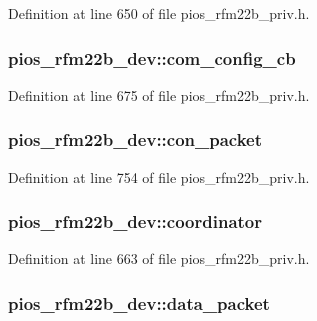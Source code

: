 Definition at line 650 of file pios\-\_\-rfm22b\-\_\-priv.\-h.

\hypertarget{structpios__rfm22b__dev_abed55ffe3e0e2832d958e692f9310b6e}{
\subsubsection[{com\-\_\-config\-\_\-cb}]{ pios\-\_\-rfm22b\-\_\-dev\-::com\-\_\-config\-\_\-cb}}\label{structpios__rfm22b__dev_abed55ffe3e0e2832d958e692f9310b6e}


Definition at line 675 of file pios\-\_\-rfm22b\-\_\-priv.\-h.

\hypertarget{structpios__rfm22b__dev_a8bfeaddca61583fad2b2396d61d4c459}{
\subsubsection[{con\-\_\-packet}]{ pios\-\_\-rfm22b\-\_\-dev\-::con\-\_\-packet}}\label{structpios__rfm22b__dev_a8bfeaddca61583fad2b2396d61d4c459}


Definition at line 754 of file pios\-\_\-rfm22b\-\_\-priv.\-h.

\hypertarget{structpios__rfm22b__dev_a37c2eab9f05656b3ef5690689b0e06c9}{
\subsubsection[{coordinator}]{ pios\-\_\-rfm22b\-\_\-dev\-::coordinator}}\label{structpios__rfm22b__dev_a37c2eab9f05656b3ef5690689b0e06c9}


Definition at line 663 of file pios\-\_\-rfm22b\-\_\-priv.\-h.

\hypertarget{structpios__rfm22b__dev_a19e3336c0f0c2da02404e828d688cbd3}{
\subsubsection[{data\-\_\-packet}]{ pios\-\_\-rfm22b\-\_\-dev\-::data\-\_\-packet}}\label{structpios__rfm22b__dev_a19e3336c0f0c2da02404e828d688cbd3}


